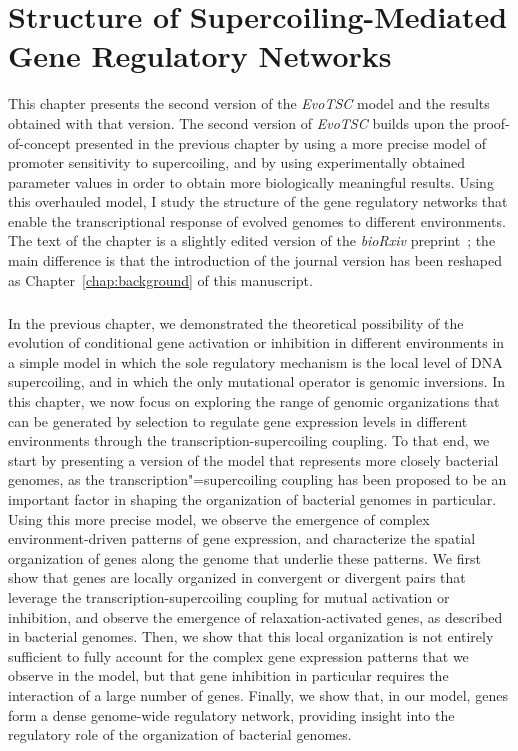 \chapter{Structure of Supercoiling-Mediated Gene Regulatory Networks}
\label{chap:ploscb}

This chapter presents the second version of the \emph{EvoTSC} model and the results obtained with that version.
The second version of \emph{EvoTSC} builds upon the proof-of-concept presented in the previous chapter by using a more precise model of promoter sensitivity to supercoiling, and by using experimentally obtained parameter values in order to obtain more biologically meaningful results.
Using this overhauled model, I study the structure of the gene regulatory networks that enable the transcriptional response of evolved genomes to different environments.
The text of the chapter is a slightly edited version of the \emph{bioRxiv} preprint~\citep{grohens2022b}; the main difference is that the introduction of the journal version has been reshaped as Chapter~\ref{chap:background} of this manuscript.

\paragraph{}
In the previous chapter, we demonstrated the theoretical possibility of the evolution of conditional gene activation or inhibition in different environments in a simple model in which the sole regulatory mechanism is the local level of DNA supercoiling, and in which the only mutational operator is genomic inversions.
In this chapter, we now focus on exploring the range of genomic organizations that can be generated by selection to regulate gene expression levels in different environments through the transcription-supercoiling coupling.
To that end, we start by presenting a version of the model that represents more closely bacterial genomes, as the transcription"=supercoiling coupling has been proposed to be an important factor in shaping the organization of bacterial genomes in particular.
Using this more precise model, we observe the emergence of complex environment-driven patterns of gene expression, and characterize the spatial organization of genes along the genome that underlie these patterns.
We first show that genes are locally organized in convergent or divergent pairs that leverage the transcription-supercoiling coupling for mutual activation or inhibition, and observe the emergence of relaxation-activated genes, as described in bacterial genomes.
Then, we show that this local organization is not entirely sufficient to fully account for the complex gene expression patterns that we observe in the model, but that gene inhibition in particular requires the interaction of a large number of genes.
Finally, we show that, in our model, genes form a dense genome-wide regulatory network, providing insight into the regulatory role of the organization of bacterial genomes.


